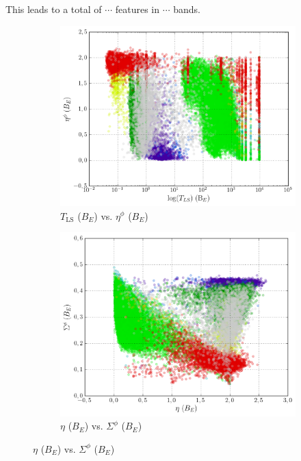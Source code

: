 This leads to a total of $\cdots$ features in $\cdots$ bands.

\begin{figure}[h]
	\centering
	\begin{subfigure}[t]{0.49\textwidth}
		\centering
		\caption{$T_{\text{LS}}$ ($B_E$) vs. $\eta^\phi$ ($B_E$)}
		\label{fig:2a}
		\includegraphics[width=\textwidth]{figures/scatterplots/B-ls-period-B-phase-eta.png}				
	\end{subfigure}
	\begin{subfigure}[t]{0.49\textwidth}
		\centering
		\caption{$\eta$ ($B_E$) vs. $\Sigma^\phi$ ($B_E$)}
		\label{fig:2b}
		\includegraphics[width=\textwidth]{figures/scatterplots/B-eta-B-phase-cs.png}		

\end{subfigure}
\end{figure}
